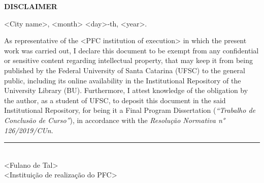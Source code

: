 
\begin{center}
	\textbf{DISCLAIMER}
\end{center}


<City name>, <month> <day>-th, <year>.

\vspace{1cm}

As representative of the <PFC institution of execution> in which the present work was carried out, I declare this document to be exempt from any confidential or sensitive content regarding intellectual property, that may keep it from being published by the Federal University of Santa Catarina (UFSC) to the general public, including its online availability in the Institutional Repository of the University Library (BU). Furthermore, I attest knowledge of the obligation by the author, as a student of UFSC, to deposit this document in the said Institutional Repository, for being it a Final Program Dissertation (\emph{``Trabalho de Conclusão de Curso''}), in accordance with the \emph{Resolução Normativa n° 126/2019/CUn}.

\vspace{15mm}

\begin{center}
	\rule{7cm}{0.7pt} \\
	<Fulano de Tal> \\
	<Instituição de realização do PFC>
\end{center}

\cleardoublepage


